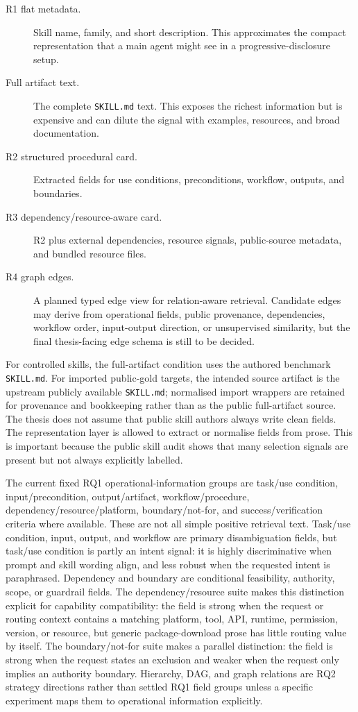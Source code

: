 \begin{description}
  \item[R1 flat metadata.] Skill name, family, and short description. This approximates the compact representation that a main agent might see in a progressive-disclosure setup.
  \item[Full artifact text.] The complete \texttt{SKILL.md} text. This exposes the richest information but is expensive and can dilute the signal with examples, resources, and broad documentation.
  \item[R2 structured procedural card.] Extracted fields for use conditions, preconditions, workflow, outputs, and boundaries.
  \item[R3 dependency/resource-aware card.] R2 plus external dependencies, resource signals, public-source metadata, and bundled resource files.
  \item[R4 graph edges.] A planned typed edge view for relation-aware retrieval. Candidate edges may derive from operational fields, public provenance, dependencies, workflow order, input-output direction, or unsupervised similarity, but the final thesis-facing edge schema is still to be decided.
\end{description}

For controlled skills, the full-artifact condition uses the authored benchmark \texttt{SKILL.md}. For imported public-gold targets, the intended source artifact is the upstream publicly available \texttt{SKILL.md}; normalised import wrappers are retained for provenance and bookkeeping rather than as the public full-artifact source. The thesis does not assume that public skill authors always write clean fields. The representation layer is allowed to extract or normalise fields from prose. This is important because the public skill audit shows that many selection signals are present but not always explicitly labelled.

The current fixed RQ1 operational-information groups are task/use condition, input/precondition, output/artifact, workflow/procedure, dependency/resource/platform, boundary/not-for, and success/verification criteria where available. These are not all simple positive retrieval text. Task/use condition, input, output, and workflow are primary disambiguation fields, but task/use condition is partly an intent signal: it is highly discriminative when prompt and skill wording align, and less robust when the requested intent is paraphrased. Dependency and boundary are conditional feasibility, authority, scope, or guardrail fields. The dependency/resource suite makes this distinction explicit for capability compatibility: the field is strong when the request or routing context contains a matching platform, tool, API, runtime, permission, version, or resource, but generic package-download prose has little routing value by itself. The boundary/not-for suite makes a parallel distinction: the field is strong when the request states an exclusion and weaker when the request only implies an authority boundary. Hierarchy, DAG, and graph relations are RQ2 strategy directions rather than settled RQ1 field groups unless a specific experiment maps them to operational information explicitly.

